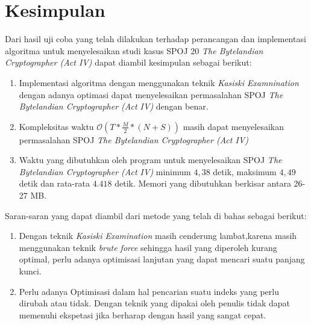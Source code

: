 
\section{Kesimpulan}
Dari hasil uji coba yang telah dilakukan terhadap perancangan dan implementasi algoritma untuk menyelesaikan studi kasus SPOJ 20 \textit{The Bytelandian Cryptographer (Act IV)} dapat diambil kesimpulan sebagai berikut:
\begin{enumerate}
 \item Implementasi algoritma dengan menggunakan teknik \textit{Kasiski Examnination} dengan adanya optimasi dapat menyelesaikan permasalahan SPOJ \textit{The Bytelandian Cryptographer (Act IV)} dengan benar.
 \item Kompleksitas waktu $\mathcal{O}(T*\frac{M}{2}*(N+S))$ masih dapat menyelesaikan permasalahan SPOJ \textit{The Bytelandian Cryptographer (Act IV)}
 \item Waktu yang dibutuhkan oleh program untuk menyelesaikan SPOJ \textit{The Bytelandian Cryptographer (Act IV)} minimum $4,38$ detik, maksimum $4,49$ detik dan rata-rata $4.418$ detik. Memori yang dibutuhkan berkisar antara 26-27 MB. %
 \end{enumerate}
Saran-saran yang dapat diambil dari metode yang telah di bahas sebagai berikut:
  \begin{enumerate}
    \item Dengan teknik \textit{Kasiski Examination} masih cenderung lambat,karena masih menggunakan teknik \textit{brute force} sehingga hasil yang diperoleh kurang optimal, perlu adanya optimisasi lanjutan yang dapat mencari suatu panjang kunci.%
    \item Perlu adanya Optimisasi dalam hal pencarian suatu indeks yang perlu dirubah atau tidak. Dengan teknik yang dipakai oleh penulis tidak dapat memenuhi ekspetasi jika berharap dengan hasil yang sangat cepat.
    \end{enumerate}

